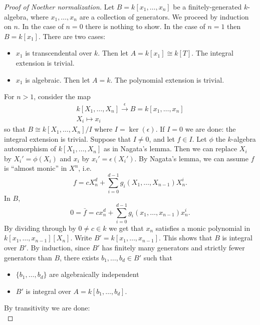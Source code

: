 \documentclass[12pt]{article}
\begin{document}
\begin{proof}[Proof of Noether normalization] 
	Let $B=k[x_1,\dots,x_n]$ be a finitely-generated $k$-algebra, where $x_1,\dots,x_n$ are a collection of generators. We proceed by induction on $n$. In the case of $n=0$ there is nothing to show. In the case of $n=1$ then $B=k[x_1]$. There are two cases:
	\begin{itemize}
		\item $x_1$ is transcendental over $k$. Then let $A=k[x_1]\cong k[T]$. The integral extension is trivial.
		\item $x_1$ is algebraic. Then let $A=k$. The polynomial extension is trivial.
	\end{itemize}
	For $n>1$, consider the map 
	\begin{gather*}
		k[X_1,\dots,X_n] \overset{\epsilon}{\to} B=k[x_1,\dots,x_n] \\
		X_i \mapsto x_i 
	\end{gather*}
	so that $B\cong k[X_1,\dots,X_n]/I$ where $I=\ker(\epsilon)$. If $I=0$ we are done: the integral extension is trivial. Suppose that $I\neq 0$, and let $f\in I$. Let $\phi$ the $k$-algebra automorphism of $k[X_1,\dots,X_n]$ as in Nagata's lemma. Then we can replace $X_i$ by $X_i'=\phi(X_i)$ and $x_i$ by $x_i'=\epsilon(X_i')$. By Nagata's lemma, we can assume $f$ is ``almost monic'' in $X^n$, i.e. 
	\begin{equation*}
		f = cX_n^d + \sum_{i=0}^{d-1}g_i(X_1,\dots,X_{n-1})X_n^i.
	\end{equation*}
	In $B$, 
	\begin{equation*}
		0 = \bar{f} = cx_n^d + \sum_{i=0}^{d-1}g_i(x_1,\dots,x_{n-1})x_n^i.
	\end{equation*}
	By dividing through by $0\neq c\in k$ we get that $x_n$ satisfies a monic polynomial in $k[x_1,\dots,x_{n-1}][X_n]$. Write $B'=k[x_1,\dots,x_{n-1}]$. This shows that $B$ is integral over $B'$. By induction, since $B'$ has finitely many generators and strictly fewer generators than $B$, there exists $b_1,\dots,b_d\in B'$ such that 
	\begin{itemize}
		\item $\{b_1,\dots,b_d\}$ are algebraically independent 
		\item $B'$ is integral over $A=k[b_1,\dots,b_d]$.
	\end{itemize}
	By transitivity we are done:
	\begin{equation*}

\end{equation*}
\end{proof}
\end{document}
